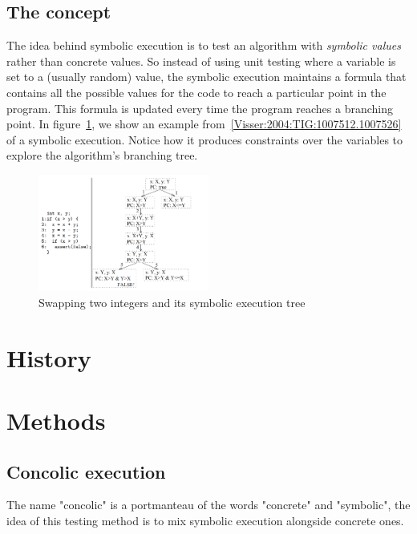 \documentclass[11pt]{article}
\begin{document}
    \subsection{The concept}
      The idea behind symbolic execution is to test an algorithm with \emph{symbolic values} rather than concrete values. So instead of using unit testing where a variable is set to a (usually random) value, the symbolic execution maintains a formula that contains all the possible values for the code to reach a particular point in the program. This formula is updated every time the program reaches a branching point. In figure~\ref{fig:symbolicsimple}, we show an example from~\ref{Visser:2004:TIG:1007512.1007526}  of a symbolic execution. Notice how it produces constraints over the variables to explore the algorithm's branching tree.	      %
      \begin{figure}	
        \includegraphics[width=0.5\textwidth]{symbolicsimple}	
        \caption{Swapping two integers and its symbolic execution tree}	
        \label{fig:symbolicsimple}	
      \end{figure}

  \section{History}

  \section{Methods}
    
    \subsection{Concolic execution}
    \label{subsec:concolicExecution}
    	The name "concolic" is a portmanteau of the words "concrete" and "symbolic", the idea of this testing method is to mix symbolic execution alongside concrete ones.\\
    	
\end{document}
